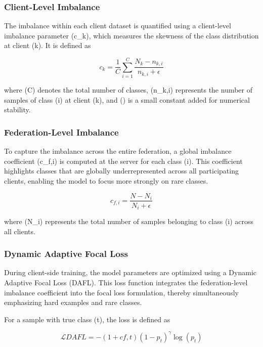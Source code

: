 \documentclass[12pt]{book}
\begin{document}
\subsubsection{Client-Level Imbalance}

The imbalance within each client dataset is quantified using a client-level imbalance parameter (c_k), which measures the skewness of the class distribution at client (k). It is defined as

\begin{equation}
c_k = \frac{1}{C} \sum_{i=1}^{C} \frac{N_k - n_{k,i}}{n_{k,i} + \epsilon}
\end{equation}

where (C) denotes the total number of classes, (n_{k,i}) represents the number of samples of class (i) at client (k), and (\epsilon) is a small constant added for numerical stability.

\subsubsection{Federation-Level Imbalance}

To capture the imbalance across the entire federation, a global imbalance coefficient (c_{f,i}) is computed at the server for each class (i). This coefficient highlights classes that are globally underrepresented across all participating clients, enabling the model to focus more strongly on rare classes.

\begin{equation}
c_{f,i} = \frac{N - N_i}{N_i + \epsilon}
\end{equation}

where (N_i) represents the total number of samples belonging to class (i) across all clients.

\subsubsection{Dynamic Adaptive Focal Loss}

During client-side training, the model parameters are optimized using a Dynamic Adaptive Focal Loss (DAFL). This loss function integrates the federation-level imbalance coefficient into the focal loss formulation, thereby simultaneously emphasizing hard examples and rare classes.

For a sample with true class (t), the loss is defined as

\begin{equation}
\mathcal{L}{DAFL} =
-(1 + c{f,t})(1 - p_t)^{\gamma} \log(p_t)
\end{equation}
\end{document}
